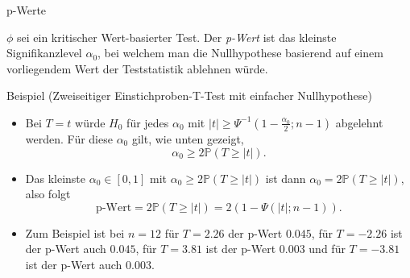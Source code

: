 \documentclass[
  8pt,
  ignorenonframetext,
]{beamer}
\providecommand{\tightlist}{%
  \setlength{\itemsep}{0pt}\setlength{\parskip}{0pt}}
\begin{document}
\begin{frame}{p-Werte}
\protect\hypertarget{p-werte-1}{}
\small
\begin{definition}[p-Wert]
\justifying
$\phi$ sei ein kritischer Wert-basierter Test. Der \textit{p-Wert} ist das
kleinste Signifikanzlevel $\alpha_0$, bei welchem man die Nullhypothese
basierend auf einem vorliegendem Wert der Teststatistik ablehnen würde.
\end{definition}
\small

Beispiel (Zweiseitiger Einstichproben-T-Test mit einfacher
Nullhypothese)

\footnotesize

\begin{itemize}
\tightlist
\item
  Bei \(T = t\) würde \(H_0\) für jedes \(\alpha_0\) mit
  \(|t| \ge \Psi^{-1}\left(1- \frac{\alpha_0}{2};n-1\right)\) abgelehnt
  werden. Für diese \(\alpha_0\) gilt, wie unten gezeigt,
  \begin{equation}
  \alpha_0 \ge 2 \mathbb{P}(T \ge |t|).
  \end{equation}
\item
  Das kleinste \(\alpha_0 \in [0,1]\) mit
  \(\alpha_0 \ge 2 \mathbb{P}(T \ge |t|)\) ist dann
  \(\alpha_0 = 2 \mathbb{P}(T \ge |t|)\), also folgt \begin{equation}
  \mbox{p-Wert} =  2 \mathbb{P}(T \ge |t|) = 2(1 - \Psi(|t|;n-1)).
  \end{equation}
\item
  Zum Beispiel ist bei \(n = 12\) für \(T = 2.26\) der p-Wert \(0.045\),
  für \(T = -2.26\) ist der p-Wert auch \(0.045\), für \(T = 3.81\) ist
  der p-Wert \(0.003\) und für \(T = -3.81\) ist der p-Wert auch
  \(0.003\).
\end{itemize}
\end{frame}
\end{document}
